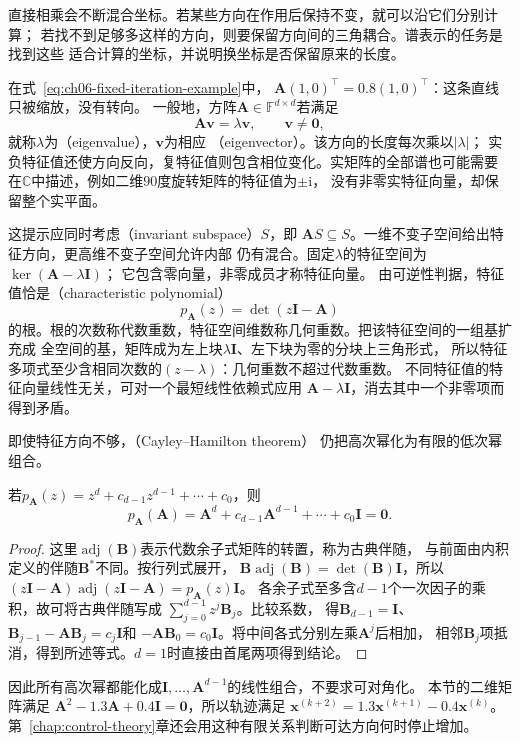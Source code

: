直接相乘会不断混合坐标。若某些方向在作用后保持不变，就可以沿它们分别计算；
若找不到足够多这样的方向，则要保留方向间的三角耦合。谱表示的任务是找到这些
适合计算的坐标，并说明换坐标是否保留原来的长度。


在式~\eqref{eq:ch06-fixed-iteration-example}中，
$\bm A(1,0)^\top=0.8(1,0)^\top$：这条直线只被缩放，没有转向。
一般地，方阵$\bm A\in\mathbb F^{d\times d}$若满足
\begin{equation}
 \bm A\bm v=\lambda\bm v,\qquad \bm v\neq\bm0,
 \label{eq:matrix-analysis-eigenpair}
\end{equation}
就称$\lambda$为（eigenvalue），$\bm v$为相应
（eigenvector）。该方向的长度每次乘以$|\lambda|$；
实负特征值还使方向反向，复特征值则包含相位变化。实矩阵的全部谱也可能需要
在$\mathbb C$中描述，例如二维$90$度旋转矩阵的特征值为$\pm\mathrm i$，
没有非零实特征向量，却保留整个实平面。

这提示应同时考虑（invariant subspace）$S$，即
$\bm A S\subseteq S$。一维不变子空间给出特征方向，更高维不变子空间允许内部
仍有混合。固定$\lambda$的特征空间为$\ker(\bm A-\lambda\bm I)$；
它包含零向量，非零成员才称特征向量。
由可逆性判据，特征值恰是（characteristic polynomial）
\begin{equation}
 p_{\bm A}(z)=\det(z\bm I-\bm A)
 \label{eq:matrix-analysis-characteristic-polynomial}
\end{equation}
的根。根的次数称代数重数，特征空间维数称几何重数。把该特征空间的一组基扩充成
全空间的基，矩阵成为左上块$\lambda\bm I$、左下块为零的分块上三角形式，
所以特征多项式至少含相同次数的$(z-\lambda)$：几何重数不超过代数重数。
不同特征值的特征向量线性无关，可对一个最短线性依赖式应用
$\bm A-\lambda\bm I$，消去其中一个非零项而得到矛盾。

即使特征方向不够，（Cayley--Hamilton theorem）
仍把高次幂化为有限的低次幂组合。
\begin{theorem}
若$p_{\bm A}(z)=z^d+c_{d-1}z^{d-1}+\cdots+c_0$，则
\[
 p_{\bm A}(\bm A)
 =\bm A^d+c_{d-1}\bm A^{d-1}+\cdots+c_0\bm I=\bm0.
\]
\end{theorem}
\begin{proof}
这里$\operatorname{adj}(\bm B)$表示代数余子式矩阵的转置，称为古典伴随，
与前面由内积定义的伴随$\bm B^*$不同。按行列式展开，
$\bm B\operatorname{adj}(\bm B)=\det(\bm B)\bm I$，所以
$(z\bm I-\bm A)\operatorname{adj}(z\bm I-\bm A)=p_{\bm A}(z)\bm I$。
各余子式至多含$d-1$个一次因子的乘积，故可将古典伴随写成
$\sum_{j=0}^{d-1}z^j\bm B_j$。比较系数，
得$\bm B_{d-1}=\bm I$、
$\bm B_{j-1}-\bm A\bm B_j=c_j\bm I$和
$-\bm A\bm B_0=c_0\bm I$。将中间各式分别左乘$\bm A^j$后相加，
相邻$\bm B_j$项抵消，得到所述等式。$d=1$时直接由首尾两项得到结论。
\end{proof}
因此所有高次幂都能化成$\bm I,\ldots,\bm A^{d-1}$的线性组合，不要求可对角化。
本节的二维矩阵满足
$\bm A^2-1.3\bm A+0.4\bm I=\bm0$，所以轨迹满足
$\bm x^{(k+2)}=1.3\bm x^{(k+1)}-0.4\bm x^{(k)}$。
第~\ref{chap:control-theory}章还会用这种有限关系判断可达方向何时停止增加。


